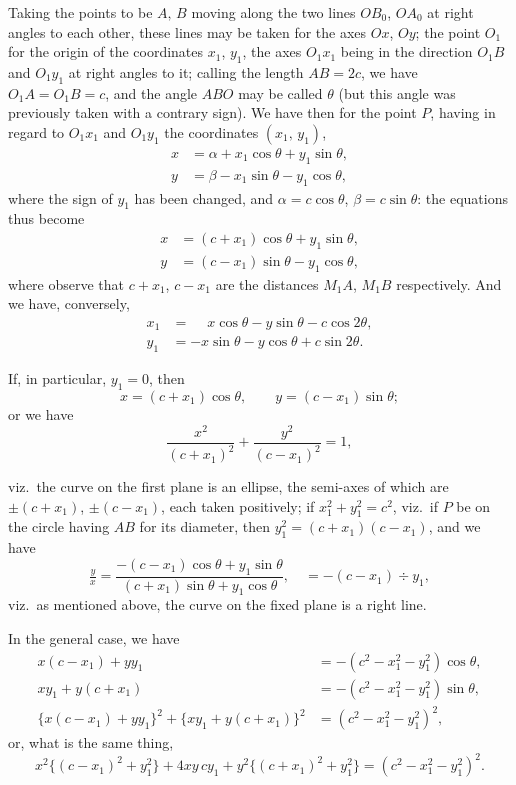 \documentclass[11pt]{article}
\begin{document}
Taking the points to be $A,\,B$ moving along the two lines $OB_0$, $OA_0$ at right
angles to each other, these lines may be taken for the axes $Ox$, $Oy$; the point $O_1$
for the origin of the coordinates $x_1$, $y_1$, the axes $O_1 x_1$ being in the direction $O_1 B$
and $O_1 y_1$ at right angles to it; calling the length $AB = 2c$, we have $O_1 A = O_1 B = c$,
and the angle $ABO$ may be called $\theta$ (but this angle was previously taken with a
contrary sign). We have then for the point $P$, having in regard to $O_1 x_1$ and $O_1 y_1$ the
coordinates $(x_1,\,y_1)$,
\begin{align*}
x &= \alpha + x_1 \cos\theta + y_1 \sin\theta,\\
y &= \beta  - x_1 \sin\theta - y_1 \cos\theta,
\end{align*}
where the sign of $y_1$ has been changed, and $\alpha = c\cos\theta$, $\beta = c\sin\theta$: the equations thus
become
\begin{align*}
x &= (c + x_1)\cos\theta + y_1 \sin\theta,\\
y &= (c - x_1)\sin\theta - y_1 \cos\theta,
\end{align*}
where observe that $c + x_1$, $c - x_1$ are the distances $M_1 A$, $M_1 B$ respectively. And we
have, conversely,
\begin{align*}
x_1 &= \phantom{-}x\cos\theta - y\sin\theta - c\cos 2\theta,\\
y_1 &= -x\sin\theta - y\cos\theta + c\sin 2\theta.
\end{align*}

If, in particular, $y_1 = 0$, then
\[
   x = (c + x_1)\cos\theta,\qquad y = (c - x_1)\sin\theta;
\]
or we have
\[
   \frac{x^2}{(c+x_1)^2} + \frac{y^2}{(c-x_1)^2} = 1,
\]

\bigskip

\noindent
viz.\ the curve on the first plane is an ellipse, the semi-axes of which are $\pm(c+x_1)$,
$\pm(c-x_1)$, each taken positively; if $x_1^2 + y_1^2 = c^2$, viz.\ if $P$ be on the circle having
$AB$ for its diameter, then $y_1^2 = (c+x_1)(c-x_1)$, and we have
\[
   \tfrac{y}{x} = \frac{-(c-x_1)\cos\theta + y_1\sin\theta}{(c+x_1)\sin\theta + y_1\cos\theta}, \quad = -(c-x_1)\div y_1,
\]
viz.\ as mentioned above, the curve on the fixed plane is a right line.

In the general case, we have
\begin{align*}
x(c-x_1) + yy_1 &= -(c^2 - x_1^2 - y_1^2)\cos\theta,\\
xy_1 + y(c+x_1) &= -(c^2 - x_1^2 - y_1^2)\sin\theta,\\
\bigl\{x(c-x_1) + yy_1\bigr\}^2 + \bigl\{xy_1 + y(c+x_1)\bigr\}^2 &= (c^2 - x_1^2 - y_1^2)^2,
\end{align*}
or, what is the same thing,
\[
  x^2 \bigl\{(c-x_1)^2 + y_1^2\bigr\} + 4xy\,cy_1 + y^2\bigl\{(c+x_1)^2 + y_1^2\bigr\} = (c^2 - x_1^2 - y_1^2)^2.
\]
\end{document}
